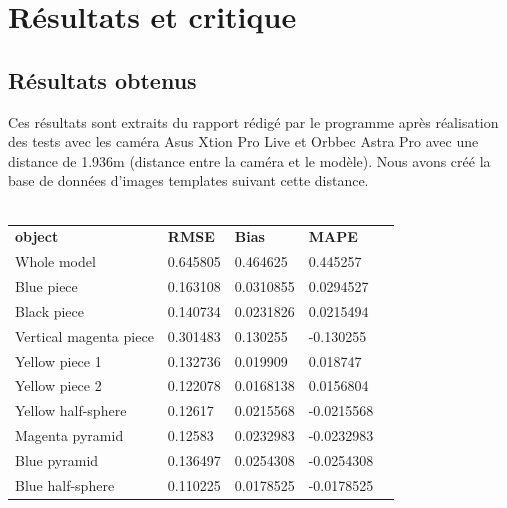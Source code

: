 \documentclass[a4paper, 12pt]{book}
\newcounter{program}[subsection]
\begin{document}
\section{Résultats et critique}
\subsection{Résultats obtenus}
Ces résultats sont extraits du rapport rédigé par le programme après réalisation des tests avec les caméra Asus Xtion Pro Live et Orbbec Astra Pro avec une distance de 1.936m (distance entre la caméra et le modèle). Nous avons créé la base de données d'images templates suivant cette distance.  \\ \\

\begin{table}[H]
\begin{tabular}{c|llll}
\cline{1-4}
\multicolumn{1}{|l|}{\textbf{object}}   & \multicolumn{1}{l|}{\textbf{RMSE}} & \multicolumn{1}{l|}{\textbf{Bias}} & \multicolumn{1}{l|}{\textbf{MAPE}} &  \\
\cline{1-4}
\multicolumn{1}{|l|}{Whole model}  & \multicolumn{1}{l|}{0.645805}  & \multicolumn{1}{l|}{0.464625}  & \multicolumn{1}{l|}{0.445257}  &  \\ 
\cline{1-4}
\multicolumn{1}{|l|}{Blue piece}  & \multicolumn{1}{l|}{0.163108}  & \multicolumn{1}{l|}{0.0310855}  & \multicolumn{1}{l|}{0.0294527}  &  \\ 
\cline{1-4}
\multicolumn{1}{|l|}{Black piece}  & \multicolumn{1}{l|}{0.140734}  & \multicolumn{1}{l|}{0.0231826}  & \multicolumn{1}{l|}{0.0215494}  &  \\ 
\cline{1-4}
\multicolumn{1}{|l|}{Vertical magenta piece}  & \multicolumn{1}{l|}{0.301483}  & \multicolumn{1}{l|}{0.130255}  & \multicolumn{1}{l|}{-0.130255}  &  \\ 
\cline{1-4}
\multicolumn{1}{|l|}{Yellow piece 1}  & \multicolumn{1}{l|}{0.132736}  & \multicolumn{1}{l|}{0.019909}  & \multicolumn{1}{l|}{0.018747}  &  \\ 
\cline{1-4}
\multicolumn{1}{|l|}{Yellow piece 2}  & \multicolumn{1}{l|}{0.122078}  & \multicolumn{1}{l|}{0.0168138}  & \multicolumn{1}{l|}{0.0156804}  &  \\ 
\cline{1-4}
\multicolumn{1}{|l|}{Yellow half-sphere}  & \multicolumn{1}{l|}{0.12617}  & \multicolumn{1}{l|}{0.0215568}  & \multicolumn{1}{l|}{-0.0215568}  &  \\ 
\cline{1-4}
\multicolumn{1}{|l|}{Magenta pyramid}  & \multicolumn{1}{l|}{0.12583}  & \multicolumn{1}{l|}{0.0232983}  & \multicolumn{1}{l|}{-0.0232983}  &  \\ 
\cline{1-4}
\multicolumn{1}{|l|}{Blue pyramid}  & \multicolumn{1}{l|}{0.136497}  & \multicolumn{1}{l|}{0.0254308}  & \multicolumn{1}{l|}{-0.0254308}  &  \\ 
\cline{1-4}
\multicolumn{1}{|l|}{Blue  half-sphere}  & \multicolumn{1}{l|}{0.110225}  & \multicolumn{1}{l|}{0.0178525}  & \multicolumn{1}{l|}{-0.0178525}  &  \\ 
\cline{1-4}
\end{tabular}
\end{table}
\end{document}
